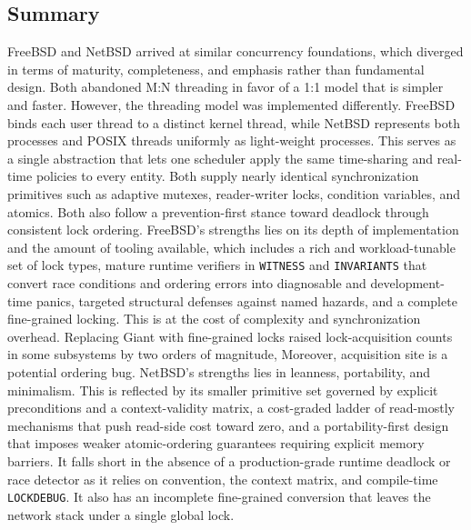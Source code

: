 \subsection{Summary} \label{concurrency-summary} %

FreeBSD and NetBSD arrived at similar concurrency foundations, which diverged in terms of maturity, completeness, and
emphasis rather than fundamental design. Both abandoned M:N threading in favor of a 1:1 model that is simpler and faster.
However, the threading model was implemented differently. FreeBSD binds each user thread to a distinct kernel thread,
while NetBSD represents both processes and POSIX threads uniformly as light-weight processes. This serves as a single
abstraction that lets one scheduler apply the same time-sharing and real-time policies to every entity. Both supply nearly
identical synchronization primitives such as adaptive mutexes, reader-writer locks, condition variables, and atomics.
Both also follow a prevention-first stance toward deadlock through consistent lock ordering. FreeBSD's strengths lies
on its depth of implementation and the amount of tooling available, which includes a rich and workload-tunable set of
lock types, mature runtime verifiers in \texttt{WITNESS} and \texttt{INVARIANTS} that convert race conditions and
ordering errors into diagnosable and development-time panics, targeted structural defenses against named hazards,
and a complete fine-grained locking. This is at the cost of complexity and synchronization overhead. Replacing Giant
with fine-grained locks raised lock-acquisition counts in some subsystems by two orders of magnitude, Moreover,
acquisition site is a potential ordering bug. NetBSD's strengths lies in leanness, portability, and minimalism.
This is reflected by its smaller primitive set governed by explicit preconditions and a context-validity matrix,
a cost-graded ladder of read-mostly mechanisms that push read-side cost toward zero, and a portability-first design
that imposes weaker atomic-ordering guarantees requiring explicit memory barriers. It falls short in the absence of
a production-grade runtime deadlock or race detector as it relies on convention, the context matrix, and compile-time
\texttt{LOCKDEBUG}. It also has an incomplete fine-grained conversion that leaves the network stack under a single
global lock.

